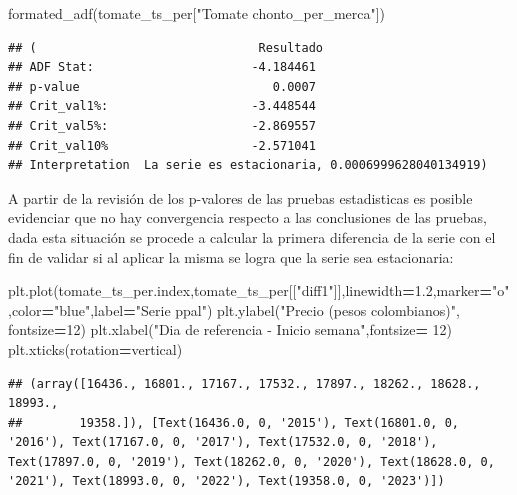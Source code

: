 \documentclass[
]{book}
\newenvironment{Shaded}{\begin{snugshade}}{\end{snugshade}}
\newcommand{\DecValTok}[1]{\textcolor[rgb]{0.00,0.00,0.81}{#1}}
\newcommand{\FloatTok}[1]{\textcolor[rgb]{0.00,0.00,0.81}{#1}}
\newcommand{\NormalTok}[1]{#1}
\newcommand{\OperatorTok}[1]{\textcolor[rgb]{0.81,0.36,0.00}{\textbf{#1}}}
\newcommand{\StringTok}[1]{\textcolor[rgb]{0.31,0.60,0.02}{#1}}
\begin{document}
\begin{Shaded}
\begin{Highlighting}[]
\NormalTok{formated\_adf(tomate\_ts\_per[}\StringTok{"Tomate chonto\_per\_merca"}\NormalTok{])}
\end{Highlighting}
\end{Shaded}

\begin{verbatim}
## (                               Resultado
## ADF Stat:                      -4.184461
## p-value                           0.0007
## Crit_val1%:                    -3.448544
## Crit_val5%:                    -2.869557
## Crit_val10%                    -2.571041
## Interpretation  La serie es estacionaria, 0.0006999628040134919)
\end{verbatim}

A partir de la revisión de los p-valores de las pruebas estadisticas es posible evidenciar que no hay convergencia respecto a las conclusiones de las pruebas, dada esta situación se procede a calcular la primera diferencia de la serie con el fin de validar si al aplicar la misma se logra que la serie sea estacionaria:

\begin{Shaded}
\begin{Highlighting}[]

\NormalTok{plt.plot(tomate\_ts\_per.index,tomate\_ts\_per[[}\StringTok{"diff1"}\NormalTok{]],linewidth}\OperatorTok{=}\FloatTok{1.2}\NormalTok{,marker}\OperatorTok{=}\StringTok{"o"}\NormalTok{,color}\OperatorTok{=}\StringTok{"blue"}\NormalTok{,label}\OperatorTok{=}\StringTok{"Serie ppal"}\NormalTok{)}
\NormalTok{plt.ylabel(}\StringTok{"Precio (pesos colombianos)"}\NormalTok{, fontsize}\OperatorTok{=}\DecValTok{12}\NormalTok{)}
\NormalTok{plt.xlabel(}\StringTok{"Dia de referencia {-} Inicio semana"}\NormalTok{,fontsize}\OperatorTok{=} \DecValTok{12}\NormalTok{)}
\NormalTok{plt.xticks(rotation}\OperatorTok{=}\StringTok{\textquotesingle{}vertical\textquotesingle{}}\NormalTok{)}
\end{Highlighting}
\end{Shaded}

\begin{verbatim}
## (array([16436., 16801., 17167., 17532., 17897., 18262., 18628., 18993.,
##        19358.]), [Text(16436.0, 0, '2015'), Text(16801.0, 0, '2016'), Text(17167.0, 0, '2017'), Text(17532.0, 0, '2018'), Text(17897.0, 0, '2019'), Text(18262.0, 0, '2020'), Text(18628.0, 0, '2021'), Text(18993.0, 0, '2022'), Text(19358.0, 0, '2023')])
\end{verbatim}
\end{document}
